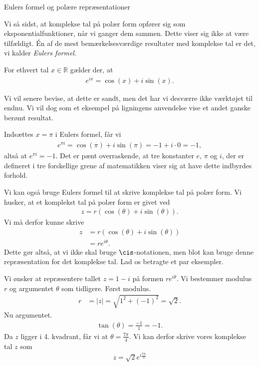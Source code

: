 \begin{center}
	\Huge
	Eulers formel og polære repræsentationer
\end{center}
Vi så sidst, at komplekse tal på polær form opfører sig som eksponentialfunktioner, når vi ganger dem sammen. Dette viser sig ikke at være tilfældigt. Én af de mest bemærkelsesværdige resultater med komplekse tal er det, vi kalder \textit{Eulers formel}.
\begin{setn}
	For ethvert tal $x \in \mathbb{R}$ gælder der, at 
	\begin{align*}
		e^{ix} = \cos(x) + i\sin(x).
	\end{align*}
\end{setn}
Vi vil senere bevise, at dette er sandt, men det har vi desværre ikke værktøjet til endnu. Vi vil dog som et eksempel på ligningens anvendelse vise et andet ganske berømt resultat.
\begin{exa}
	Indsættes $x = \pi$ i Eulers formel, får vi
	\begin{align*}
		e^{\pi i} = \cos(\pi) + i \sin(\pi) = -1 + i\cdot 0 = -1,
	\end{align*}
	altså at $e^{\pi i } = -1$. Det er pænt overraskende, at tre konstanter $e$, $\pi$ og $i$, der er defineret i tre 
	forskellige grene af matematikken viser sig at have dette indbyrdes forhold. 
\end{exa}
Vi kan også bruge Eulers formel til at skrive komplekse tal på polær form. Vi husker, at et komplekst tal på polær form er givet ved
\begin{align*}
	z = r(\cos(\theta)+ i \sin(\theta)).
\end{align*}
Vi må derfor kunne skrive
\begin{align*}
	z &= r(\cos(\theta)+ i \sin(\theta))\\
	&=re^{i\theta}.
\end{align*}
Dette gør altså, at vi ikke skal bruge $\cis$-notationen, men blot kan bruge denne repræsentation for det komplekse tal. 
Lad os betragte et par eksempler.
\begin{exa}
	Vi ønsker at repræsentere tallet $z = 1 - i$ på formen $re^{i\theta}$. Vi bestemmer modulus $r$ og argumentet 
	$\theta$ som tidligere. Først modulus.
	\begin{align*}
		r &= |z| = \sqrt{1^2 + (-1)^2} = \sqrt{2}.
	\end{align*}
	Nu argumentet.
	\begin{align*}
		\tan(\theta) = \frac{-1}{1} = -1.
	\end{align*}
	Da $z$ ligger i 4. kvadrant, får vi at $\theta = \frac{7\pi}{4}$. 
	Vi kan derfor skrive vores komplekse tal $z$ som
	\begin{align*}
		z = \sqrt{2}e^{i \frac{7 \pi}{4}}
	\end{align*}
\end{exa}	
